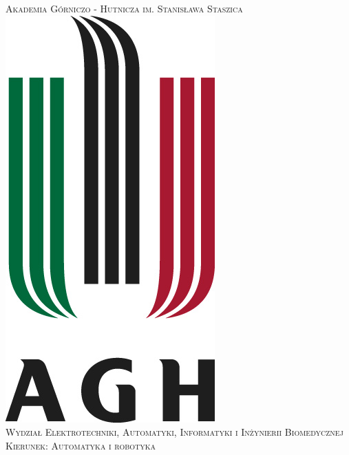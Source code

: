 \begin{titlepage}

\newcommand{\HRule}{\rule{\linewidth}{0.5mm}} %

\center %
 

\textsc{\LARGE Akademia Górniczo - Hutnicza im. Stanisława Staszica}\\[0.5cm]
\includegraphics[scale=0.6]{agh}\\[1cm] %
\textsc{\Large Wydział Elektrotechniki, Automatyki, Informatyki i Inżynierii Biomedycznej}\\[0.5cm] %
\textsc{\large Kierunek: Automatyka i robotyka}\\[0.5cm] %



\end{titlepage}
